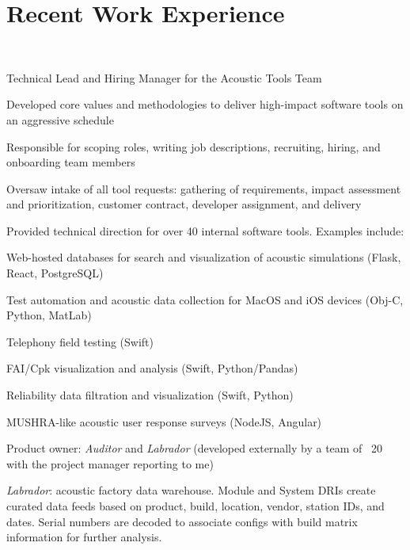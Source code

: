 \documentclass[]{jhearn-resume}
\begin{document}
\begin{minipage}[t]{0.64\textwidth}
\section{Recent Work Experience}
 \\
\vspace{\topsep} %
\begin{tightemize}
\item Technical Lead and Hiring Manager for the Acoustic Tools Team
\item Developed core values and methodologies to deliver high-impact software tools on an aggressive schedule
\item Responsible for scoping roles, writing job descriptions, recruiting, hiring, and onboarding team members
\item Oversaw intake of all tool requests: gathering of requirements, impact assessment and prioritization, customer contract, developer assignment, and delivery   
\item Provided technical direction for over 40 internal software tools. Examples include:
	\begin{tightemize}
	\vspace{\topsep}
	\item Web-hosted databases for search and visualization of acoustic simulations (Flask, React, PostgreSQL)
	\item Test automation and acoustic data collection for MacOS and iOS devices (Obj-C, Python, MatLab)
	\item Telephony field testing (Swift)
	\item FAI/Cpk visualization and analysis (Swift, Python/Pandas)
	\item Reliability data filtration and visualization (Swift, Python)
	\item MUSHRA-like acoustic user response surveys (NodeJS, Angular)
	\end{tightemize}
	\vspace{\topsep}
\item Product owner: \emph{Auditor} and \emph{Labrador} (developed externally by a team of ~20 with the project manager reporting to me)
	\begin{tightemize}
	\vspace{\topsep}
	\item \emph{Labrador}: acoustic factory data warehouse. Module and System DRIs create curated data feeds based on product, build, location, vendor, station IDs, and dates. Serial numbers are decoded to associate configs with build matrix information for further analysis.

\end{tightemize}
\end{tightemize}
\end{minipage}
\end{document}
